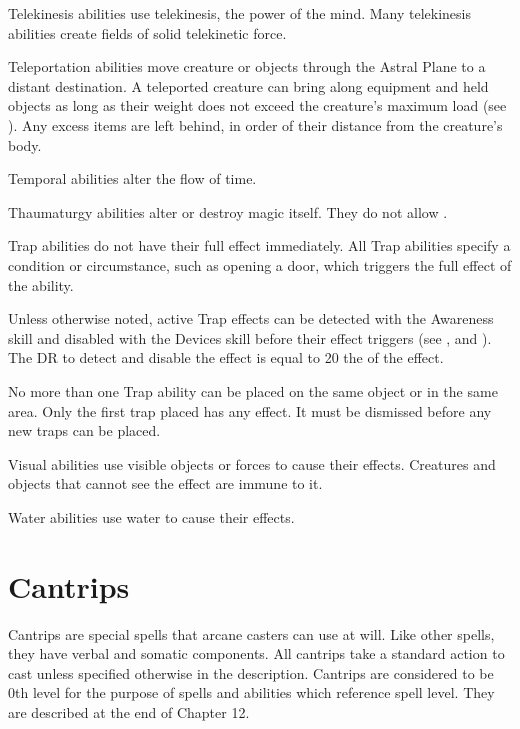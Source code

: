      Telekinesis abilities use telekinesis, the power of the mind.
    Many telekinesis abilities create fields of solid telekinetic force.

     Teleportation abilities move creature or objects through the Astral Plane to a distant destination.
    A teleported creature can bring along equipment and held objects as long as their weight does not exceed the creature's maximum load (see ). Any excess items are left behind, in order of their distance from the creature's body.

     Temporal abilities alter the flow of time.

     Thaumaturgy abilities alter or destroy magic itself.
    They do not allow .

     Trap abilities do not have their full effect immediately.
    All Trap abilities specify a condition or circumstance, such as opening a door, which triggers the full effect of the ability.
    \par Unless otherwise noted, active Trap effects can be detected with the Awareness skill and disabled with the Devices skill before their effect triggers (see , and ).
    The DR to detect and disable the effect is equal to 20 \add the  of the effect.
    \par No more than one Trap ability can be placed on the same object or in the same area.
    Only the first trap placed has any effect.
    It must be dismissed before any new traps can be placed.

     Visual abilities use visible objects or forces to cause their effects.
    Creatures and objects that cannot see the effect are immune to it.

     Water abilities use water to cause their effects.

\section{Cantrips}\label{Cantrips}
    Cantrips are special spells that arcane casters can use at will.
    Like other spells, they have verbal and somatic components.
    All cantrips take a standard action to cast unless specified otherwise in the description.
    Cantrips are considered to be 0th level for the purpose of spells and abilities which reference spell level.
    They are described at the end of Chapter 12.

